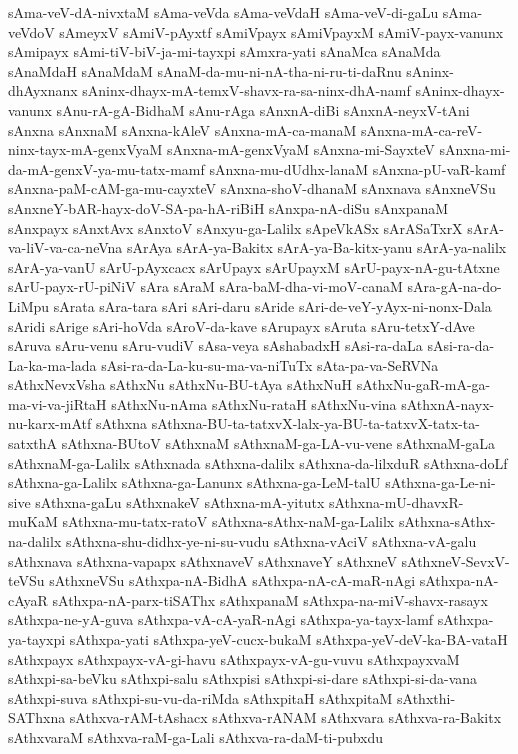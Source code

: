 {sAma-veV-dA-nivxtaM
sAma-veVda
sAma-veVdaH
sAma-veV-di-gaLu
sAma-veVdoV
sAmeyxV
sAmiV-pAyxtf
sAmiVpayx
sAmiVpayxM
sAmiV-payx-vanunx
sAmipayx
sAmi-tiV-biV-ja-mi-tayxpi
sAmxra-yati
sAnaMca
sAnaMda
sAnaMdaH
sAnaMdaM
sAnaM-da-mu-ni-nA-tha-ni-ru-ti-daRnu
sAninx-dhAyxnanx
sAninx-dhayx-mA-temxV-shavx-ra-sa-ninx-dhA-namf
sAninx-dhayx-vanunx
sAnu-rA-gA-BidhaM
sAnu-rAga
sAnxnA-diBi
sAnxnA-neyxV-tAni
sAnxna
sAnxnaM
sAnxna-kAleV
sAnxna-mA-ca-manaM
sAnxna-mA-ca-reV-ninx-tayx-mA-genxVyaM
sAnxna-mA-genxVyaM
sAnxna-mi-SayxteV
sAnxna-mi-da-mA-genxV-ya-mu-tatx-mamf
sAnxna-mu-dUdhx-lanaM
sAnxna-pU-vaR-kamf
sAnxna-paM-cAM-ga-mu-cayxteV
sAnxna-shoV-dhanaM
sAnxnava
sAnxneVSu
sAnxneY-bAR-hayx-doV-SA-pa-hA-riBiH
sAnxpa-nA-diSu
sAnxpanaM
sAnxpayx
sAnxtAvx
sAnxtoV
sAnxyu-ga-Lalilx
sApeVkASx
sArASaTxrX
sArA-va-liV-va-ca-neVna
sArAya
sArA-ya-Bakitx
sArA-ya-Ba-kitx-yanu
sArA-ya-nalilx
sArA-ya-vanU
sArU-pAyxcacx
sArUpayx
sArUpayxM
sArU-payx-nA-gu-tAtxne
sArU-payx-rU-piNiV
sAra
sAraM
sAra-baM-dha-vi-moV-canaM
sAra-gA-na-do-LiMpu
sArata
sAra-tara
sAri
sAri-daru
sAride
sAri-de-veY-yAyx-ni-nonx-Dala
sAridi
sArige
sAri-hoVda
sAroV-da-kave
sArupayx
sAruta
sAru-tetxY-dAve
sAruva
sAru-venu
sAru-vudiV
sAsa-veya
sAshabadxH
sAsi-ra-daLa
sAsi-ra-da-La-ka-ma-lada
sAsi-ra-da-La-ku-su-ma-va-niTuTx
sAta-pa-va-SeRVNa
sAthxNevxVsha
sAthxNu
sAthxNu-BU-tAya
sAthxNuH
sAthxNu-gaR-mA-ga-ma-vi-va-jiRtaH
sAthxNu-nAma
sAthxNu-rataH
sAthxNu-vina
sAthxnA-nayx-nu-karx-mAtf
sAthxna
sAthxna-BU-ta-tatxvX-lalx-ya-BU-ta-tatxvX-tatx-ta-satxthA
sAthxna-BUtoV
sAthxnaM
sAthxnaM-ga-LA-vu-vene
sAthxnaM-gaLa
sAthxnaM-ga-Lalilx
sAthxnada
sAthxna-dalilx
sAthxna-da-lilxduR
sAthxna-doLf
sAthxna-ga-Lalilx
sAthxna-ga-Lanunx
sAthxna-ga-LeM-talU
sAthxna-ga-Le-ni-sive
sAthxna-gaLu
sAthxnakeV
sAthxna-mA-yitutx
sAthxna-mU-dhavxR-muKaM
sAthxna-mu-tatx-ratoV
sAthxna-sAthx-naM-ga-Lalilx
sAthxna-sAthx-na-dalilx
sAthxna-shu-didhx-ye-ni-su-vudu
sAthxna-vAciV
sAthxna-vA-galu
sAthxnava
sAthxna-vapapx
sAthxnaveV
sAthxnaveY
sAthxneV
sAthxneV-SevxV-teVSu
sAthxneVSu
sAthxpa-nA-BidhA
sAthxpa-nA-cA-maR-nAgi
sAthxpa-nA-cAyaR
sAthxpa-nA-parx-tiSAThx
sAthxpanaM
sAthxpa-na-miV-shavx-rasayx
sAthxpa-ne-yA-guva
sAthxpa-vA-cA-yaR-nAgi
sAthxpa-ya-tayx-lamf
sAthxpa-ya-tayxpi
sAthxpa-yati
sAthxpa-yeV-cucx-bukaM
sAthxpa-yeV-deV-ka-BA-vataH
sAthxpayx
sAthxpayx-vA-gi-havu
sAthxpayx-vA-gu-vuvu
sAthxpayxvaM
sAthxpi-sa-beVku
sAthxpi-salu
sAthxpisi
sAthxpi-si-dare
sAthxpi-si-da-vana
sAthxpi-suva
sAthxpi-su-vu-da-riMda
sAthxpitaH
sAthxpitaM
sAthxthi-SAThxna
sAthxva-rAM-tAshacx
sAthxva-rANAM
sAthxvara
sAthxva-ra-Bakitx
sAthxvaraM
sAthxva-raM-ga-Lali
sAthxva-ra-daM-ti-pubxdu
}
